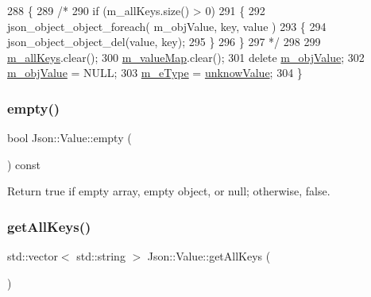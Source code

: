 \begin{DoxyCode}
288     \{
289         \textcolor{comment}{/*}
290 \textcolor{comment}{        if (m\_allKeys.size() > 0)}
291 \textcolor{comment}{        \{}
292 \textcolor{comment}{            json\_object\_object\_foreach( m\_objValue, key, value )}
293 \textcolor{comment}{            \{}
294 \textcolor{comment}{                json\_object\_object\_del(value, key);}
295 \textcolor{comment}{            \}}
296 \textcolor{comment}{        \}}
297 \textcolor{comment}{        */}
298 
299         \hyperlink{class_json_1_1_value_a914e4896d12ffa87726125d2f60ea9c0}{m\_allKeys}.clear();
300         \hyperlink{class_json_1_1_value_a2b9203575d8ff75f02d30e09befb1204}{m\_valueMap}.clear();
301         \textcolor{keyword}{delete} \hyperlink{class_json_1_1_value_a3a705e06c2dbc4a6e142b58b0cbca57e}{m\_objValue};
302         \hyperlink{class_json_1_1_value_a3a705e06c2dbc4a6e142b58b0cbca57e}{m\_objValue} = NULL;
303         \hyperlink{class_json_1_1_value_ae6116e08a5c1833f858c1d29156365b1}{m\_eType} = \hyperlink{namespace_json_a7d654b75c16a57007925868e38212b4eaf3bec0dbeafa6b0fdc48db16179b6369}{unknowValue};
304     \}
\end{DoxyCode}
\mbox{\label{class_json_1_1_value_a0519a551e37ee6665d74742b3f96bab3}} 
\subsubsection{\texorpdfstring{empty()}{empty()}}
{\footnotesize\ttfamily bool Json\+::\+Value\+::empty (\begin{DoxyParamCaption}{ }\end{DoxyParamCaption}) const}



Return true if empty array, empty object, or null; otherwise, false. 

\mbox{\label{class_json_1_1_value_af7ab87d24164058af2b20e67ac4a1093}} 
\subsubsection{\texorpdfstring{get\+All\+Keys()}{getAllKeys()}}
{\footnotesize\ttfamily std\+::vector$<$ std\+::string $>$ Json\+::\+Value\+::get\+All\+Keys (\begin{DoxyParamCaption}{ }\end{DoxyParamCaption})}




